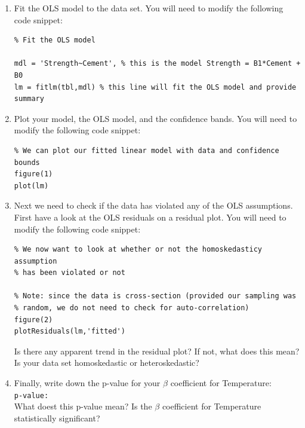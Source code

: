 \documentclass[12pt]{article}
\begin{document}
\begin{enumerate}
\item Fit the OLS model to the data set. You will need to modify the following code snippet:
\vspace{-0.8cm}
\begin{lstlisting}
% Fit the OLS model

mdl = 'Strength~Cement', % this is the model Strength = B1*Cement + B0
lm = fitlm(tbl,mdl) % this line will fit the OLS model and provide summary
\end{lstlisting}

\item Plot your model, the OLS model, and the confidence bands. You will need to modify the following code snippet:
\vspace{-0.4cm}
\begin{lstlisting}
% We can plot our fitted linear model with data and confidence bounds
figure(1)
plot(lm)
\end{lstlisting}

\item Next we need to check if the data has violated any of the OLS assumptions. First have a look at the OLS residuals on a residual plot. You will need to modify the following code snippet:
\vspace{-0.4cm}
\begin{lstlisting}
% We now want to look at whether or not the homoskedasticy assumption
% has been violated or not

% Note: since the data is cross-section (provided our sampling was
% random, we do not need to check for auto-correlation)
figure(2)
plotResiduals(lm,'fitted')
\end{lstlisting}

Is there any apparent trend in the residual plot? If not, what does this mean? Is your data set homoskedastic or heteroskedastic?

\item Finally, write down the p-value for your $\beta$ coefficient for Temperature:\\

\vspace{-0.5cm}
\verb|p-value:|\\

What doest this p-value mean? Is the $\beta$ coefficient for Temperature statistically significant?
\end{enumerate}
\end{document}
